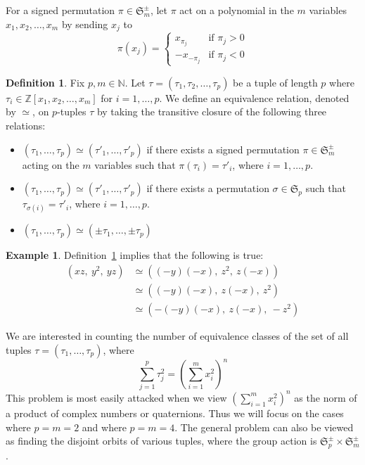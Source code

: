 \documentclass[12pt,table]{article}
\theoremstyle{definition}
\newtheorem{definition}[theorem]{Definition}
\newtheorem{example}[theorem]{Example}
\theoremstyle{remark}
\newcommand{\Nnn}{\mathbb N}
\newcommand{\Zzz}{\mathbb Z}
\numberwithin{equation}{section}
\begin{document}
For a signed permutation $ \pi \in \mathfrak{S}_m^\pm $,
let $ \pi $ act on a polynomial in the 
$m$ variables $ x_1,x_2, \dotsc, x_m $ by sending $ x_j $ to 
\[
\pi(x_j) =
\begin{cases}
x_{\pi_j} & \text{if } \pi_j > 0 \\
-x_{-\pi_j} & \text{if } \pi_j < 0
\end{cases}
\]

\begin{definition}
\label{def:general}
Fix $ p, m \in \Nnn $. 
Let $ \tau = ( \tau_1, \tau_2, \dotsc, \tau_p) $
be a tuple of length $ p $ where 
$ \tau_i \in \Zzz[x_1,x_2, \dotsc, x_m] $ for $ i = 1, \dotsc, p $.
We define an equivalence relation, denoted by $ \simeq $, on $p$-tuples
$ \tau $ 
by taking the transitive closure of the following three relations:
\begin{itemize}
\item
$ ( \tau_1, \dotsc, \tau_p) \simeq ( \tau'_1, \dotsc, \tau'_p) $
if there exists a signed permutation $ \pi \in \mathfrak{S}_m^\pm $
acting on the $ m $ variables such that $ \pi( \tau_i ) = \tau'_i $,
 where $ i = 1, \dotsc, p $.
\item
$ ( \tau_1, \dotsc, \tau_p) \simeq ( \tau'_1, \dotsc, \tau'_p) $
if there exists a permutation $ \sigma \in \mathfrak{S}_p $
such that $ \tau_{\sigma(i)} = \tau'_i $, where $ i = 1, \dotsc, p $.
\item
$ ( \tau_1, \dotsc, \tau_p) \simeq ( \pm \tau_1, \dotsc, \pm \tau_p) $
\end{itemize}
\end{definition}


\begin{example}
Definition~\ref{def:general} implies that the following is true:
\begin{align*}
( xz,\: y^2,\: yz )  
&\simeq ( (-y)(-x),\: z^2,\: z(-x) ) \\
&\simeq ( (-y)(-x),\: z(-x),\: z^2 ) \\
&\simeq ( -(-y)(-x),\: z(-x),\: -z^2 ) 
\end{align*}
\end{example}



We are interested in counting the number of
equivalence classes of the set of all tuples
 $ \tau = ( \tau_1, \dotsc, \tau_p) $,
where
\begin{equation}
\label{equation_general}
\sum_{j = 1}^{p}  \tau_j ^ 2  
= 
\left( \sum_{i = 1}^{m}  x_i ^ 2  \right) ^ n 
\end{equation}
This problem is most easily attacked when we
view $ \left( \sum_{i = 1}^{m}  x_i ^ 2  \right) ^ n $
as the norm of a product of complex numbers or quaternions.
Thus we will focus on the cases where $ p = m = 2 $ and where $ p = m = 4 $.
The general problem can also be viewed as finding the disjoint orbits of 
various tuples, where the group action is $ \mathfrak{S}_p^\pm \times \mathfrak{S}_m^\pm $.
\end{document}
